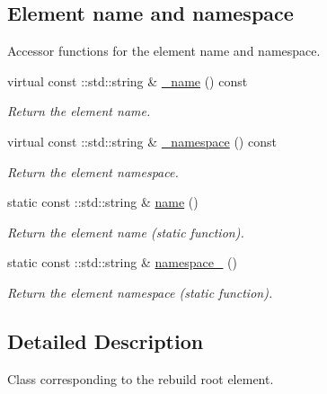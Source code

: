 \subsection*{Element name and namespace}
\label{_amgrpd4b5b61f6e07390f4af2465e04571f34}
Accessor functions for the element name and namespace. \begin{DoxyCompactItemize}
\item 
virtual const ::std::string \& \hyperlink{classopenstack_1_1xml_1_1Rebuild___aaa17504fa214492f172dd9381801a8fe}{\_\-name} () const 
\begin{DoxyCompactList}\small\item\em Return the element name. \item\end{DoxyCompactList}\item 
virtual const ::std::string \& \hyperlink{classopenstack_1_1xml_1_1Rebuild___ad91ba3b25b0edefaff7e7e5f5c822d9f}{\_\-namespace} () const 
\begin{DoxyCompactList}\small\item\em Return the element namespace. \item\end{DoxyCompactList}\item 
static const ::std::string \& \hyperlink{classopenstack_1_1xml_1_1Rebuild___a60d23b4ec883cd5428ee09abd9b4666b}{name} ()
\begin{DoxyCompactList}\small\item\em Return the element name (static function). \item\end{DoxyCompactList}\item 
static const ::std::string \& \hyperlink{classopenstack_1_1xml_1_1Rebuild___a0d060953d386d7dffde027b303abc27a}{namespace\_\-} ()
\begin{DoxyCompactList}\small\item\em Return the element namespace (static function). \item\end{DoxyCompactList}\end{DoxyCompactItemize}


\subsection{Detailed Description}
Class corresponding to the rebuild root element. 

